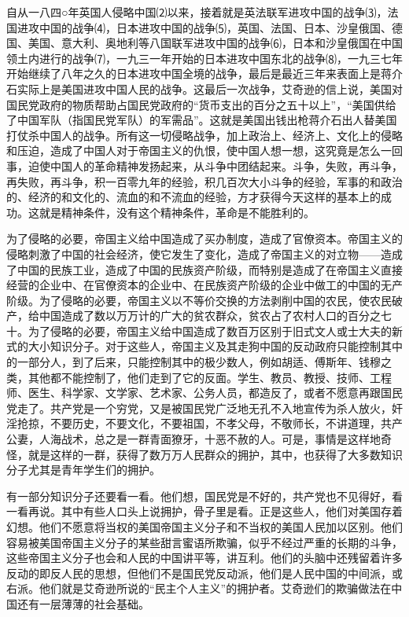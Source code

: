 \documentclass[UTF-8, a5paper, 12pt]{ctexart}
\begin{document}
自从一八四○年英国人侵略中国⑵以来，接着就是英法联军进攻中国的战争⑶，法国进攻中国的战争⑷，日本进攻中国的战争⑸，英国、法国、日本、沙皇俄国、德国、美国、意大利、奥地利等八国联军进攻中国的战争⑹，日本和沙皇俄国在中国领土内进行的战争⑺，一九三一年开始的日本进攻中国东北的战争⑻，一九三七年开始继续了八年之久的日本进攻中国全境的战争，最后是最近三年来表面上是蒋介石实际上是美国进攻中国人民的战争。这最后一次战争，艾奇逊的信上说，美国对国民党政府的物质帮助占国民党政府的“货币支出的百分之五十以上”，“美国供给了中国军队（指国民党军队）的军需品”。这就是美国出钱出枪蒋介石出人替美国打仗杀中国人的战争。所有这一切侵略战争，加上政治上、经济上、文化上的侵略和压迫，造成了中国人对于帝国主义的仇恨，使中国人想一想，这究竟是怎么一回事，迫使中国人的革命精神发扬起来，从斗争中团结起来。斗争，失败，再斗争，再失败，再斗争，积一百零九年的经验，积几百次大小斗争的经验，军事的和政治的、经济的和文化的、流血的和不流血的经验，方才获得今天这样的基本上的成功。这就是精神条件，没有这个精神条件，革命是不能胜利的。

为了侵略的必要，帝国主义给中国造成了买办制度，造成了官僚资本。帝国主义的侵略刺激了中国的社会经济，使它发生了变化，造成了帝国主义的对立物——造成了中国的民族工业，造成了中国的民族资产阶级，而特别是造成了在帝国主义直接经营的企业中、在官僚资本的企业中、在民族资产阶级的企业中做工的中国的无产阶级。为了侵略的必要，帝国主义以不等价交换的方法剥削中国的农民，使农民破产，给中国造成了数以万万计的广大的贫农群众，贫农占了农村人口的百分之七十。为了侵略的必要，帝国主义给中国造成了数百万区别于旧式文人或士大夫的新式的大小知识分子。对于这些人，帝国主义及其走狗中国的反动政府只能控制其中的一部分人，到了后来，只能控制其中的极少数人，例如胡适、傅斯年、钱穆之类，其他都不能控制了，他们走到了它的反面。学生、教员、教授、技师、工程师、医生、科学家、文学家、艺术家、公务人员，都造反了，或者不愿意再跟国民党走了。共产党是一个穷党，又是被国民党广泛地无孔不入地宣传为杀人放火，奸淫抢掠，不要历史，不要文化，不要祖国，不孝父母，不敬师长，不讲道理，共产公妻，人海战术，总之是一群青面獠牙，十恶不赦的人。可是，事情是这样地奇怪，就是这样的一群，获得了数万万人民群众的拥护，其中，也获得了大多数知识分子尤其是青年学生们的拥护。

有一部分知识分子还要看一看。他们想，国民党是不好的，共产党也不见得好，看一看再说。其中有些人口头上说拥护，骨子里是看。正是这些人，他们对美国存着幻想。他们不愿意将当权的美国帝国主义分子和不当权的美国人民加以区别。他们容易被美国帝国主义分子的某些甜言蜜语所欺骗，似乎不经过严重的长期的斗争，这些帝国主义分子也会和人民的中国讲平等，讲互利。他们的头脑中还残留着许多反动的即反人民的思想，但他们不是国民党反动派，他们是人民中国的中间派，或右派。他们就是艾奇逊所说的“民主个人主义”的拥护者。艾奇逊们的欺骗做法在中国还有一层薄薄的社会基础。
\end{document}
